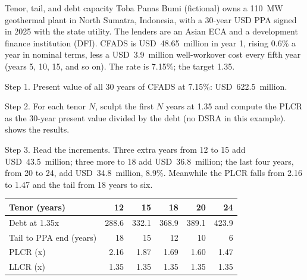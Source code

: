 \begin{example}{Tenor, tail, and debt capacity \illustrative}\label{ex:36.7}
Toba Panas Bumi (fictional) owns a 110~MW geothermal plant in North Sumatra, Indonesia, with a 30-year USD PPA signed in 2025 with the state utility. The lenders are an Asian ECA and a development finance institution (DFI). CFADS is USD~48.65~million in year 1, rising 0.6\% a year in nominal terms, less a USD~3.9~million well-workover cost every fifth year (years 5, 10, 15, and so on). The rate is 7.15\%; the target 1.35\x.

Step 1. Present value of all 30 years of CFADS at 7.15\%: USD~622.5~million.

Step 2. For each tenor $N$, sculpt the first $N$ years at 1.35\x{} and compute the PLCR as the 30-year present value divided by the debt (no DSRA in this example).  shows the results.

Step 3. Read the increments. Three extra years from 12 to 15 add USD~43.5~million; three more to 18 add USD~36.8~million; the last four years, from 20 to 24, add USD~34.8~million, 8.9\%. Meanwhile the PLCR falls from 2.16\x{} to 1.47\x{} and the tail from 18 years to six.
\end{example}

\begin{exhibit}[H]
\caption{Debt, tail, and PLCR by tenor (USD m) \illustrative}\label{exh:36.6}
\small
\begin{tabularx}{\linewidth}{@{}L rrrrr@{}}
\toprule
Tenor (years) & 12 & 15 & 18 & 20 & 24\\
\midrule
Debt at 1.35x & 288.6 & 332.1 & 368.9 & 389.1 & 423.9\\
Tail to PPA end (years) & 18 & 15 & 12 & 10 & 6\\
PLCR (x) & 2.16 & 1.87 & 1.69 & 1.60 & 1.47\\
LLCR (x) & 1.35 & 1.35 & 1.35 & 1.35 & 1.35\\
\bottomrule
\end{tabularx}
\end{exhibit}

